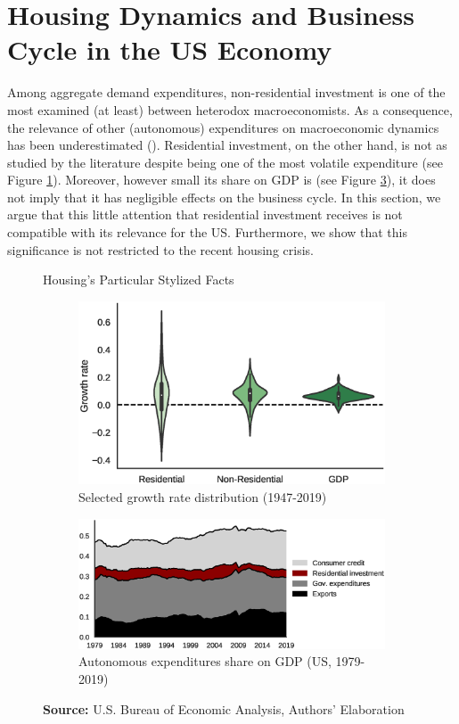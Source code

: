 \section{Housing Dynamics and Business Cycle in the US Economy}\label{sec:Stylized_Facts}

Among aggregate demand expenditures, non-residential investment is one of the most examined (at least) between heterodox macroeconomists.
As a consequence, the relevance of other (autonomous) expenditures on macroeconomic dynamics has been underestimated (\cite{brochier_macroeconomics_2017}).
Residential investment, on the other hand, is not as studied by the literature despite being one of the most volatile expenditure (see Figure \ref{FigVolatilidade}).
Moreover, however small its share on GDP is (see Figure \ref{FigAutonomos}), it does not imply that it has negligible effects on the business cycle.
In this section, we argue that this little attention that residential investment receives is not compatible with its relevance for the US.
Furthermore, we show that this significance is not restricted to the recent housing crisis.

\begin{figure}
	\caption{Housing's Particular Stylized Facts}
	\label{fig:figs}
	\begin{subfigure}[t]{.5\textwidth}
		\centering
		\caption{Selected growth rate distribution (1947-2019)}
		\label{FigVolatilidade}
		\includegraphics[width=.8\linewidth]{./figs/Volatilidade.eps}
	\end{subfigure}
	\begin{subfigure}[t]{.5\textwidth}
		\centering
		\caption{Autonomous expenditures share on GDP (US, 1979-2019)}
		\label{FigAutonomos}
		\includegraphics[width=.8\linewidth]{./figs/Gastos_autonomos.eps}  
	\end{subfigure}
	\caption*{\textbf{Source:} U.S. Bureau of Economic Analysis, Authors' Elaboration}
\end{figure}


